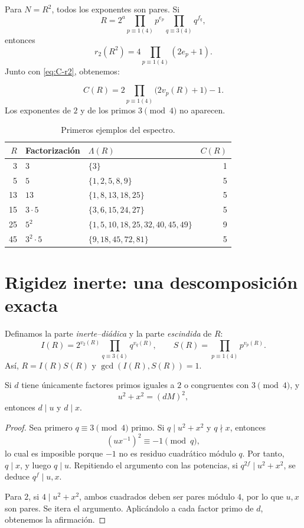 \documentclass[11pt,a4paper,openany]{report}
\newcommand{\Lam}{\Lambda}
\begin{document}
Para \(N=R^2\), todos los exponentes son pares. Si
\[
 R=2^a\prod_{p\equiv1(4)}p^{e_p}
       \prod_{q\equiv3(4)}q^{f_q},
\]
entonces
\[
 r_2(R^2)=4\prod_{p\equiv1(4)}(2e_p+1).
\]
Junto con \eqref{eq:C-r2}, obtenemos:

\begin{theorem}
\begin{equation}
 \boxed{
 C(R)=2\prod_{p\equiv1(4)}\bigl(2v_p(R)+1\bigr)-1.}
 \label{eq:Cfactor}
\end{equation}
Los exponentes de \(2\) y de los primos \(3\pmod4\) no aparecen.
\end{theorem}

\begin{table}[H]
\centering
\caption{Primeros ejemplos del espectro.}
\begin{tabular}{rllr}
\toprule
\(R\)&Factorización&\(\Lam(R)\)&\(C(R)\)\\
\midrule
3&\(3\)&\(\{3\}\)&1\\
5&\(5\)&\(\{1,2,5,8,9\}\)&5\\
13&\(13\)&\(\{1,8,13,18,25\}\)&5\\
15&\(3\cdot5\)&\(\{3,6,15,24,27\}\)&5\\
25&\(5^2\)&\(\{1,5,10,18,25,32,40,45,49\}\)&9\\
45&\(3^2\cdot5\)&\(\{9,18,45,72,81\}\)&5\\
\bottomrule
\end{tabular}
\label{tab:spectra}
\end{table}

\section{Rigidez inerte: una descomposición exacta}

Definamos la parte \emph{inerte--diádica} y la parte \emph{escindida} de \(R\):
\begin{equation}
 I(R)=2^{v_2(R)}\prod_{q\equiv3(4)}q^{v_q(R)},
 \qquad
 S(R)=\prod_{p\equiv1(4)}p^{v_p(R)}.
 \label{eq:ISparts}
\end{equation}
Así, \(R=I(R)S(R)\) y \(\gcd(I(R),S(R))=1\).

\begin{lemma}
Si \(d\) tiene únicamente factores primos iguales a \(2\) o congruentes con \(3\pmod4\), y
\[
 u^2+x^2=(dM)^2,
\]
entonces \(d\mid u\) y \(d\mid x\).
\end{lemma}

\begin{proof}
Sea primero \(q\equiv3\pmod4\) primo. Si \(q\mid u^2+x^2\) y \(q\nmid x\), entonces
\[
 (ux^{-1})^2\equiv-1\pmod q,
\]
lo cual es imposible porque \(-1\) no es residuo cuadrático módulo \(q\). Por tanto, \(q\mid x\), y luego \(q\mid u\). Repitiendo el argumento con las potencias, si \(q^{2f}\mid u^2+x^2\), se deduce \(q^f\mid u,x\).

Para \(2\), si \(4\mid u^2+x^2\), ambos cuadrados deben ser pares módulo \(4\), por lo que \(u,x\) son pares. Se itera el argumento. Aplicándolo a cada factor primo de \(d\), obtenemos la afirmación.
\end{proof}
\end{document}
